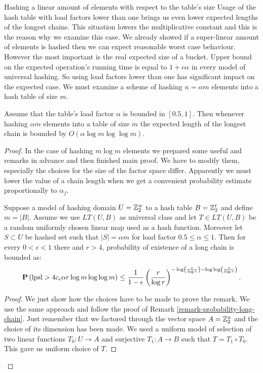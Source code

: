 \begin{section}{Hashing a linear amount of elements with respect to the table's size}
Usage of the hash table with load factors lower than one brings us even lower expected lengths of the longest chains. This situation lowers the multiplicative constant and this is the reason why we examine this case. We already showed if a super-linear amount of elements is hashed then we can expect reasonable worst case behaviour. However the most important is the real expected size of a bucket. Upper bound on the expected operation's running time is equal to $1 + c \alpha$ in every model of universal hashing. So using load factors lower than one has significant impact on the expected case. We must examine a scheme of hashing $n = \alpha m$ elements into a hash table of size $m$. 

\begin{theorem}
\label{theorem-n-to-n}
Assume that the table's load factor $\alpha$ is bounded in $\left[0.5, 1\right]$. Then whenever hashing $\alpha m$ elements into a table of size $m$ the expected length of the longest chain is bounded by $O(\alpha \log m \log \log m)$.
\end{theorem}
\begin{proof}

In the case of hashing $m \log m$ elements we prepared some useful and remarks in advance and then finished main proof. We have to modify them, especially the choices for the size of the factor space differ. Apparently we must lower the value of a chain length when we get a convenient probability estimate proportionally to $\alpha_f$. 

\begin{remark}
Suppose a model of hashing domain $U = \mathbb{Z}_{2}^{w}$ to a hash table $B = \mathbb{Z}_{2}^{t}$ and define $m = |B|$. Assume we use $LT(U, B)$ as universal class and let $T \in LT(U, B)$ be a random uniformly chosen linear map used as a hash function. Moreover let $S \subset U$ be hashed set such that $|S| = \alpha m$ for load factor $0.5 \leq \alpha \leq 1$. Then for every $0 < \epsilon < 1$ there and $r > 4$,  probability of existence of a long chain is bounded as:
\[
\mathbf{P}\left(\mathrm{lpsl} > 4 c_\epsilon \alpha r \log m \log \log m\right) \leq \frac{1}{1 - \epsilon} \left(\frac{r}{\log r}\right)^{-\log \left(\frac{r}{\log r}\right) - \log \log \left(\frac{r}{\log r}\right)} \text{.}
\]
\end{remark}
\begin{proof}
We just show how the choices have to be made to prove the remark. We use the same approach and follow the proof of Remark \ref{remark-probability-long-chain}. Just remember that we factored through the vector space $A = \mathbb{Z}_{2}^{u}$ and the choice of its dimension has been made. We used a uniform model of selection of two linear functions $T_0: U \rightarrow A$ and surjective $T_1: A \rightarrow B$ such that $T = T_1 \circ T_0$. This gave us uniform choice of $T$.


\end{proof}
\end{proof}
\end{section}
